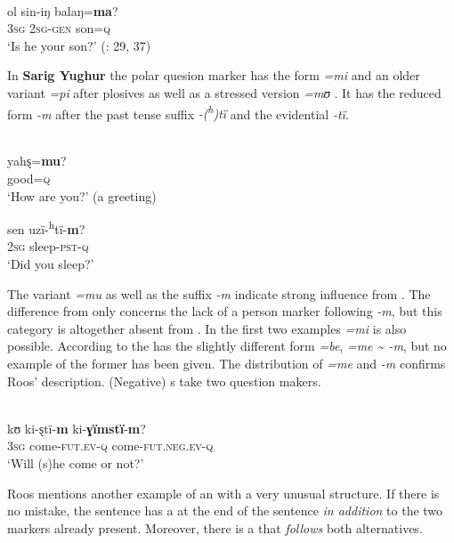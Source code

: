 \ea%
    \label{ex:turk:51}
    \\
    \gll ol  sin-iŋ    balaŋ=\textbf{{ma}}?\\
    3\textsc{sg}  2\textsc{sg}-\textsc{gen}  son=\textsc{q}\\
    \glt ‘Is he your son?’ (\citealt{HuImart1987}: 29, 37)
    \z

In \textbf{Sarig Yughur} the polar quesion marker has the form \textit{=mi} and an older variant \textit{=pi} after plosives as well as a stressed version \textit{=mʊ} \citep[152]{Roos2000}. It has the reduced form \textit{-m} after the past tense suffix \textit{-(}\textit{\textsuperscript{h}}\textit{)tï} and the evidential \textit{-tï}.

\ea%
    \label{ex:turk:52}
    \\
    \ea
    \gll yahȿ=\textbf{{mu}}?\\
    good=\textsc{q}\\
    \glt ‘How are you?’ (a greeting)
    
    \ex
    \gll sen  uzï-\textsuperscript{h}{tï-}\textbf{{m}}?\\
    2\textsc{sg}  sleep-\textsc{pst}-\textsc{q}\\
    \glt ‘Did you sleep?’ \citep[152]{Roos2000}
    \z
    \z

\noindent The variant \textit{=mu} as well as the suffix \textit{-m} indicate strong influence from . The difference from  only concerns the lack of a person marker following \textit{-m}, but this category is altogether absent from  \citep[100]{Roos2000}. In the first two examples \textit{=mi} is also possible. According to \citet[76]{ChenZongzhen1982} the  has the slightly different form \textit{=be}, \textit{=me {\textasciitilde} -m}, but no example of the former has been given. The distribution of \textit{=me} and \textit{-m} confirms Roos’ description. (Negative) s take two question makers.

\ea%
    \label{ex:turk:53}
    \\
    \gll kʊ  ki-ȿtï-\textbf{{m}} ki-\textbf{{ɣïmstï}}-\textbf{{m}}?\\
    3\textsc{sg}  come-\textsc{fut}.\textsc{ev}-\textsc{q}  come-\textsc{fut}.\textsc{neg}.\textsc{ev}-\textsc{q}\\
    \glt ‘Will (s)he come or not?’ \citep[152]{Roos2000}
    \z

Roos mentions another example of an  with a very unusual structure. If there is no mistake, the sentence has a  at the end of the sentence \textit{in addition} to the two markers already present. Moreover, there is a  that \textit{follows} both alternatives.

